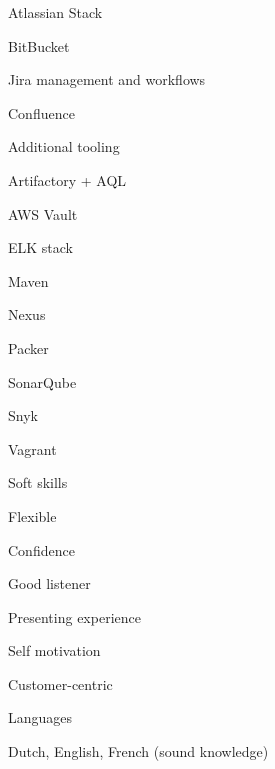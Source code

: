 \begin{cvskills}
  \cvskill
    {Atlassian Stack} %
    {
      \begin{cvitems} %
        \item {BitBucket} %
        \item {Jira management and workflows} %
        \item {Confluence} %
      \end{cvitems}
    }

  \cvskill
    {Additional tooling} %
    {
      \begin{cvitems} %
        \item {Artifactory + AQL} %
        \item {AWS Vault} %
        \item {ELK stack} %
        \item {Maven} %
        \item {Nexus} %
        \item {Packer} %
        \item {SonarQube} %
        \item {Snyk} %
        \item {Vagrant} %
      \end{cvitems}
    }

  \cvskill
    {Soft skills} %
    {
      \begin{cvitems} %
        \item {Flexible} %
        \item {Confidence} %
        \item {Good listener} %
        \item {Presenting experience} %
        \item {Self motivation} %
        \item {Customer-centric} %
      \end{cvitems}
    }

  \cvskill
    {Languages} %
    {
      \begin{cvitems} %
        \item {Dutch, English, French (sound knowledge)} %
      \end{cvitems}
    }

\end{cvskills}
